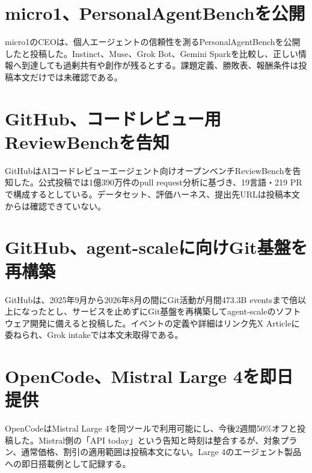 \section{micro1、PersonalAgentBenchを公開}
micro1のCEOは、個人エージェントの信頼性を測るPersonalAgentBenchを公開したと投稿した。Instinct、Muse、Grok Bot、Gemini Sparkを比較し、正しい情報へ到達しても過剰共有や創作が残るとする。課題定義、勝敗表、報酬条件は投稿本文だけでは未確認である。

\section{GitHub、コードレビュー用ReviewBenchを告知}
GitHubはAIコードレビューエージェント向けオープンベンチReviewBenchを告知した。公式投稿では1億390万件のpull request分析に基づき、19言語・219 PRで構成するとしている。データセット、評価ハーネス、提出先URLは投稿本文からは確認できていない。

\section{GitHub、agent-scaleに向けGit基盤を再構築}
GitHubは、2025年9月から2026年8月の間にGit活動が月間473.3B eventsまで倍以上になったとし、サービスを止めずにGit基盤を再構築してagent-scaleのソフトウェア開発に備えると投稿した。イベントの定義や詳細はリンク先X Articleに委ねられ、Grok intakeでは本文未取得である。

\section{OpenCode、Mistral Large 4を即日提供}
OpenCodeはMistral Large 4を同ツールで利用可能にし、今後2週間50\%オフと投稿した。Mistral側の「API today」という告知と時刻は整合するが、対象プラン、通常価格、割引の適用範囲は投稿本文にない。Large 4のエージェント製品への即日搭載例として記録する。
